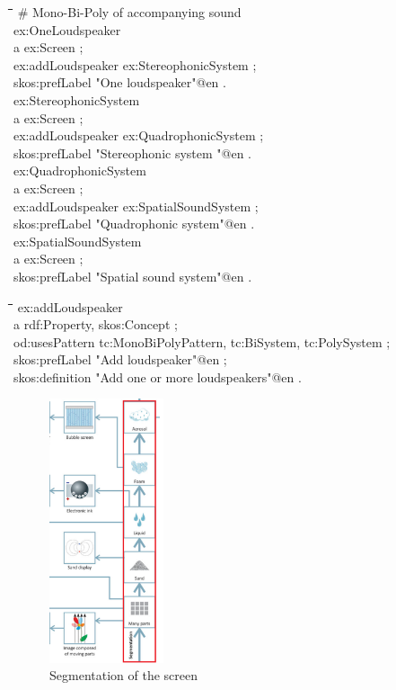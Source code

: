 \documentclass[11pt,a4paper]{article}
\newenvironment{code}{\tt \begin{tabbing}
\hskip12pt\=\hskip12pt\=\hskip12pt\=\hskip12pt\=\hskip5cm\=\hskip5cm\=\kill}
{\end{tabbing}}
\begin{document}
\begin{code}
\# Mono-Bi-Poly of accompanying sound\\[4pt]
ex:OneLoudspeaker \\
\> a ex:Screen ;\\
\> ex:addLoudspeaker ex:StereophonicSystem ;\\
\> skos:prefLabel "One loudspeaker"@en .\\[4pt]
ex:StereophonicSystem \\
\> a ex:Screen ; \\
\> ex:addLoudspeaker ex:QuadrophonicSystem ;\\
\> skos:prefLabel "Stereophonic system "@en .\\[4pt]
ex:QuadrophonicSystem \\
\> a ex:Screen ; \\
\> ex:addLoudspeaker ex:SpatialSoundSystem ;\\
\> skos:prefLabel "Quadrophonic system"@en .\\[4pt]
ex:SpatialSoundSystem\\
\> a ex:Screen ; \\
\> skos:prefLabel "Spatial sound system"@en .
\end{code}
\newpage
\begin{code}
ex:addLoudspeaker\\
\> a rdf:Property, skos:Concept ;\\
\> od:usesPattern tc:MonoBiPolyPattern, tc:BiSystem, tc:PolySystem ;\\
\> skos:prefLabel "Add loudspeaker"@en ;\\
\> skos:definition "Add one or more loudspeakers"@en .
\end{code}

\begin{figure}
  \begin{center}\vspace*{-1em}
    \includegraphics[width=0.3\textwidth]{figures/segmentation.png}
  \end{center}
  \caption{\small Segmentation of the screen \cite{Shpakovsky2016}}
  \label{fig:segmentation}
\end{figure}
\end{document}
